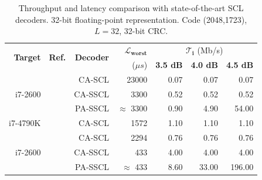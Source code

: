 \begin{table}
  \centering
  \caption{Throughput and latency comparison with state-of-the-art SCL decoders.
    32-bit floating-point representation. Code (2048,1723), $L = 32$, 32-bit
    CRC.}
  \label{tab:eval_polar_scl_perfs_comparison}
  \begin{tabular}{r r r r r r r}
    \multirow{2}{*}{\textbf{Target}} & \multirow{2}{*}{\textbf{Ref.}}        & \multirow{2}{*}{\textbf{Decoder}} & \multirow{1}{*}{\textbf{$\bm{\mathcal{L}_{worst}}$}} & \multicolumn{3}{c}{$\bm{\mathcal{T}_i}$ (Mb/s)} \\
    \cline{5-7}
                                     &                                       &                                   & ($\mu s$)                         & \textbf{3.5 dB} & \textbf{4.0 dB} & \textbf{4.5 dB} \\
    \hline
    \hline
    \multirow{3}{*}{i7-2600}         & \multirow{3}{*}{\cite{Sarkis2014b}}   & CA-SCL                            & 23000                             &  0.07           &  0.07           &   0.07          \\
                                     &                                       & CA-SSCL                           &  3300                             &  0.52           &  0.52           &   0.52          \\
                                     &                                       & PA-SSCL                           & $\approx$ 3300                    &  0.90           &  4.90           &  54.00          \\
    \hline
    \multirow{1}{*}{i7-4790K}        & \cite{Shen2016}                       & CA-SCL                            &  1572                             &  1.10           &  1.10           &   1.10          \\
    \hline
    \multirow{3}{*}{i7-2600}         & \multirow{3}{*}{\cite{Sarkis2016}}    & CA-SCL                            &  2294                             &  0.76           &  0.76           &   0.76          \\
                                     &                                       & CA-SSCL                           &   433                             &  4.00           &  4.00           &   4.00          \\
                                     &                                       & PA-SSCL                           & $\approx$ 433                     &  8.60           & 33.00           & 196.00          \\

\end{tabular}
\end{table}
